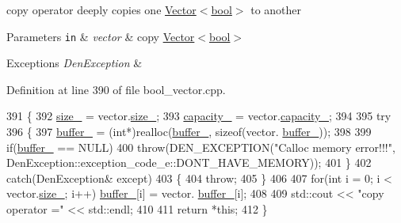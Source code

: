 copy operator  deeply copies one \hyperlink{classVector_3_01bool_01_4}{Vector$<$bool$>$} to another 


\begin{DoxyParams}[1]{Parameters}
\mbox{\tt in}  & {\em vector} & copy \hyperlink{classVector_3_01bool_01_4}{Vector$<$bool$>$} \\
\hline
\end{DoxyParams}

\begin{DoxyExceptions}{Exceptions}
{\em Den\+Exception} & \\
\hline
\end{DoxyExceptions}


Definition at line 390 of file bool\+\_\+vector.\+cpp.


\begin{DoxyCode}
391     \{
392         \hyperlink{classVector_3_01bool_01_4_a07895adb41b2c819f85640e35c0d4ae0}{size\_} = vector.\hyperlink{classVector_a3c70fa478530a90177f2a7e7621ee688}{size\_};
393         \hyperlink{classVector_3_01bool_01_4_ac3da0e4580bca55cab445ed3f9c50f2d}{capacity\_} = vector.\hyperlink{classVector_ad75911bb39018821f0e2911b6905b7ec}{capacity\_};
394 
395         \textcolor{keywordflow}{try}
396             \{
397                 \hyperlink{classVector_3_01bool_01_4_ae2183c11de877eb13209c6a5a593604f}{buffer\_} = (\textcolor{keywordtype}{int}*)realloc(\hyperlink{classVector_3_01bool_01_4_ae2183c11de877eb13209c6a5a593604f}{buffer\_}, \textcolor{keyword}{sizeof}(vector.
      \hyperlink{classVector_a22db58ae9e92c6014e8ac657804a035a}{buffer\_}));
398 
399                 \textcolor{keywordflow}{if}(\hyperlink{classVector_3_01bool_01_4_ae2183c11de877eb13209c6a5a593604f}{buffer\_} == NULL)
400                     \textcolor{keywordflow}{throw}(DEN\_EXCEPTION(\textcolor{stringliteral}{"Calloc memory error!!!"}, 
      DenException::exception\_code\_e::DONT\_HAVE\_MEMORY));
401             \}
402         \textcolor{keywordflow}{catch}(DenException& except)
403             \{
404                 \textcolor{keywordflow}{throw};
405             \}
406 
407         \textcolor{keywordflow}{for}(\textcolor{keywordtype}{int} i = 0; i < vector.\hyperlink{classVector_a3c70fa478530a90177f2a7e7621ee688}{size\_}; i++) \hyperlink{classVector_3_01bool_01_4_ae2183c11de877eb13209c6a5a593604f}{buffer\_}[i] = vector.
      \hyperlink{classVector_a22db58ae9e92c6014e8ac657804a035a}{buffer\_}[i];
408 
409         std::cout << \textcolor{stringliteral}{"copy operator ="} << std::endl;
410 
411         \textcolor{keywordflow}{return} *\textcolor{keyword}{this};
412     \}
\end{DoxyCode}
\mbox{\label{classVector_3_01bool_01_4_a025822477d0628b78d8952b6fce63915}} 
